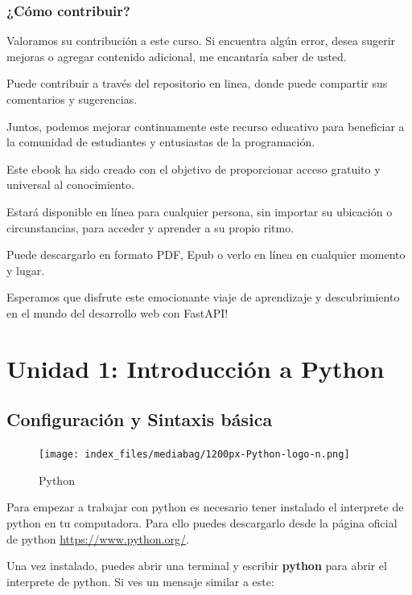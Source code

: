 \documentclass[
  a4paper,
  DIV=11,
  numbers=noendperiod,
  onepage,
  openany]{scrreprt}
\begin{document}
\section{¿Cómo contribuir?}\label{cuxf3mo-contribuir}

Valoramos su contribución a este curso. Si encuentra algún error, desea
sugerir mejoras o agregar contenido adicional, me encantaría saber de
usted.

Puede contribuir a través del repositorio en linea, donde puede
compartir sus comentarios y sugerencias.

Juntos, podemos mejorar continuamente este recurso educativo para
beneficiar a la comunidad de estudiantes y entusiastas de la
programación.

Este ebook ha sido creado con el objetivo de proporcionar acceso
gratuito y universal al conocimiento.

Estará disponible en línea para cualquier persona, sin importar su
ubicación o circunstancias, para acceder y aprender a su propio ritmo.

Puede descargarlo en formato PDF, Epub o verlo en línea en cualquier
momento y lugar.

Esperamos que disfrute este emocionante viaje de aprendizaje y
descubrimiento en el mundo del desarrollo web con FastAPI!

\part{Unidad 1: Introducción a Python}

\chapter{Configuración y Sintaxis
básica}\label{configuraciuxf3n-y-sintaxis-buxe1sica}

\begin{figure}[H]

{\centering \texttt{[image: index\_files/mediabag/1200px-Python-logo-n.png]}

}

\caption{Python}

\end{figure}%

Para empezar a trabajar con python es necesario tener instalado el
interprete de python en tu computadora. Para ello puedes descargarlo
desde la página oficial de python \url{https://www.python.org/}.

Una vez instalado, puedes abrir una terminal y escribir \textbf{python}
para abrir el interprete de python. Si ves un mensaje similar a este:
\end{document}
